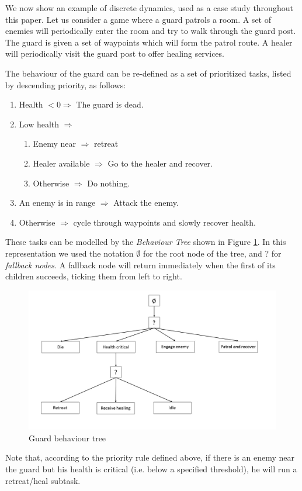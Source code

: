 We now show an example of discrete dynamics, used as a case study throughout this paper. Let us consider a game where a guard patrols a room. A set of enemies will periodically enter the room and try to walk through the guard post. The guard is given a set of waypoints which will form the patrol route. A healer will periodically visit the guard post to offer healing services.

The behaviour of the guard can be re-defined as a set of prioritized tasks, listed by descending priority, as follows:
\begin{enumerate}
\item Health $< 0 \Rightarrow$ The guard is dead.
\item Low health $\Rightarrow$
	\begin{enumerate}
		\item Enemy near $\Rightarrow$ retreat
		\item Healer available $\Rightarrow$ Go to the healer and recover.
		\item Otherwise $\Rightarrow$ Do nothing.
	\end{enumerate}
\item An enemy is in range $\Rightarrow$ Attack the enemy.
\item Otherwise $\Rightarrow$ cycle through waypoints and slowly recover health.
\end{enumerate}

These tasks can be modelled by the \textit{Behaviour Tree} shown in Figure \ref{fig:s2f1}. In this representation we used the notation $\emptyset$ for the root node of the tree, and ? for \textit{fallback nodes}. A fallback node will return immediately when the first of its children succeeds, ticking them from left to right.

\begin{figure}
	\centering
	\includegraphics[scale=0.35]{Image/Behaviour_tree}
	\caption{Guard behaviour tree}
	\label{fig:s2f1}
\end{figure}
Note that, according to the priority rule defined above, if there is an enemy near the guard but his health is critical (i.e. below a specified threshold), he will run a retreat/heal subtask.

